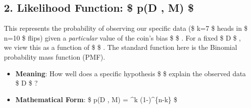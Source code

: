 \documentclass[11pt]{article}
\providecommand{\tightlist}{%
      \setlength{\itemsep}{0pt}\setlength{\parskip}{0pt}}
\begin{document}
    \subsection{\texorpdfstring{2. Likelihood Function: \$ p(D \textbar{}
\theta, M)
\$}{2. Likelihood Function: \$ p(D \textbar{} , M) \$}}\label{likelihood-function-pd-m}

This represents the probability of observing our specific data (\$ k=7
\$ heads in \$ n=10 \$ flips) given a \emph{particular} value of the
coin's bias \$ \theta \$ . For a fixed \$ D \$ , we view this as a
function of \$ \theta \$ . The standard function here is the Binomial
probability mass function (PMF).

\begin{itemize}
\tightlist
\item
  \textbf{Meaning}: How well does a specific hypothesis \$ \theta \$
  explain the observed data \$ D \$ ?
\item
  \textbf{Mathematical Form}: \$ p(D \textbar{} \theta, M) =
   \theta\^{}k (1-\theta)\^{}\{n-k\} \$
\end{itemize}
\end{document}
